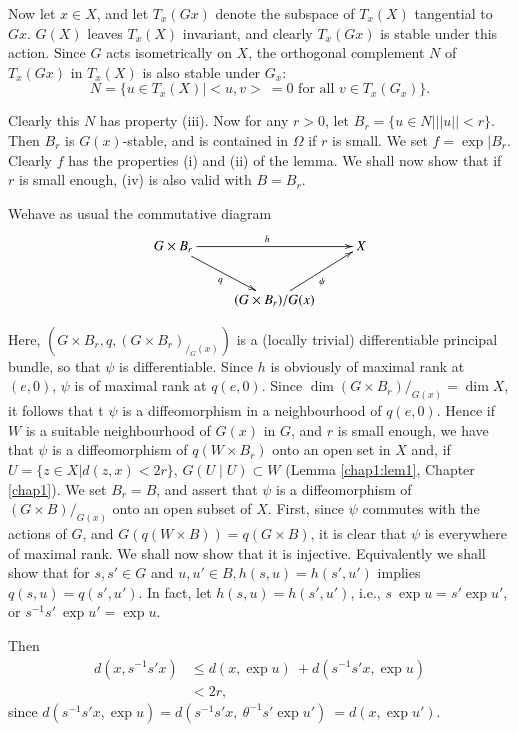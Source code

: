 Now let  $x \in X $, and let $ T_x(Gx)$ denote the  subspace of
$T_x (X)$ tangential to  $ Gx $. $G(X)$ leaves $T_x (X)$ invariant,
and clearly $T_x (Gx)$ is stable under this  action. Since $G$ acts
isometrically on  $X$, the  orthogonal complement  $N$ of  $T_x ( Gx)$
in $T_x (X)$ is also stable under $G_x$:   
$$
N =  \{ u \in  T_x (X) \mid  < u,v >  ~ =  0  \text{ for all }  v \in 
T_x ( G_x) \}.   
$$
  
\noindent
Clearly this  $N$ has  property (iii). Now for any $r > 0$, let $
B_r = \{ u \in N  \big|   || u || < r \} $.  Then $ B_r $ is $ G(x)
$-stable, and is  contained in $\Omega $ if $r$ is small. We set $f =
\exp \big| B_r $. Clearly $f$ has the properties (i) and (ii) of
the  lemma. We shall now show  that if $r$ is small enough, (iv) is
also valid with $B = B_r $. 

We\pageoriginale have as  usual the  commutative diagram
\[
\xymatrix{
\ar[dr]_q G \times B_r \ar[rr]^h && X\\
& (G \times B_r)/G(x) \ar[ru]_\psi & 
}
\]
 
\noindent
Here, $ ( G \times B_r, q, ( G \times B_r )_{/_G (x)}) $  is a
(locally trivial) differentiable  principal bundle, so that $\psi$
is  differentiable. Since $h$ is obviously of maximal rank at  $(e,
0)$, $\psi$ is of maximal rank at $q (e, 0)$. Since $ \dim ( G \times
B_r ) /_{G (x)} = \dim X $,  it follows that t $ \psi $  is a
diffeomorphism in  a  neighbourhood of  $q ( e, 0 ) $. Hence if $ W $
is a  suitable neighbourhood of  $ G (x) $ in  $ G $, and  $r$ is
small enough, we have that  $ \psi $  is a diffeomorphism  of  $ q (
W \times B_r )  $  onto an  open set in  $X$ and, if $ U = \{ z \in
X \big| d ( z, x ) < 2r \} $, $G ( U \mid U ) \subset W $ (Lemma
\ref{chap1:lem1}, Chapter \ref{chap1}). We set  $ B_r = B $, and
assert that  $ \psi $ 
is  a diffeomorphism of  $(G \times B) /_{ G (x)} $  onto an open
subset of  $X$. First, since $ \psi $ commutes with the  actions  of
$G$, and  $ G ( q ( W \times B ))  =  q ( G \times B ) $, it is
clear that  $ \psi $  is  everywhere of maximal rank. We shall now
show that it is injective. Equivalently we shall show that for $s,
s' \in G $  and  $ u, u' \in B, h ( s,u ) = h ( s', u' )  $  implies
$ q ( s,u ) =  q  ( s', u' ) $. In fact, let $ h (s, u ) = h ( s',
u')$, i.e., $s ~ \exp u = s' \exp u'$, or $s^{-1} s'  ~ \exp u' = \exp
u$. 

Then 
\begin{align*}
  d (x, s^{-1} s' x)  &\leq  d ( x, \exp u )  ~ + d ( s^{-1} s' x, \exp u ) \\
  & < 2r,  
\end{align*}
since $d( s^{-1} s' x, \exp u )  = d ( s^{-1} s' x,  ~ \theta^{-1} s'
\exp u' ) ~ = d ( x, \exp u')$.  
  
